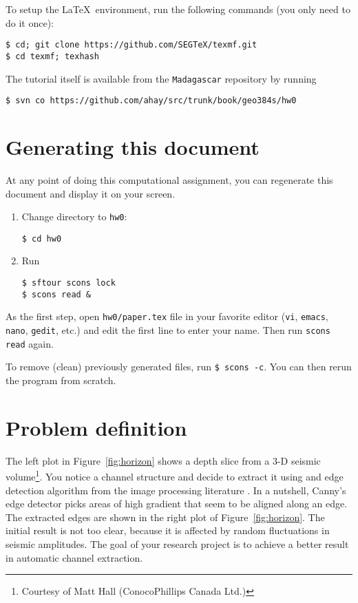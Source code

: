 To setup the \LaTeX\ environment, run the following commands (you only need to do it once):
\begin{verbatim}
$ cd; git clone https://github.com/SEGTeX/texmf.git
$ cd texmf; texhash
\end{verbatim}

The tutorial itself is available from the \texttt{Madagascar} repository
by running
\begin{verbatim}
$ svn co https://github.com/ahay/src/trunk/book/geo384s/hw0
\end{verbatim}

\section{Generating this document}

At any point of doing this computational assignment, you can
regenerate this document and display it on your screen.

\begin{enumerate}          
\item Change directory to \texttt{hw0}:
\begin{verbatim}
$ cd hw0
\end{verbatim}
\item Run
\begin{verbatim}
$ sftour scons lock
$ scons read &
\end{verbatim}
\end{enumerate}

As the first step, open \texttt{hw0/paper.tex} file in your favorite
editor (\texttt{vi}, \texttt{emacs}, \texttt{nano}, \texttt{gedit}, etc.) and edit the first line to enter your name. Then
run \texttt{scons read} again.

To remove (clean) previously generated files, run \texttt{\$ scons -c}. You can then rerun the program from scratch.


\section{Problem definition}


The left plot in Figure~\ref{fig:horizon} shows a depth slice from a 3-D
seismic volume\footnote{Courtesy of Matt Hall (ConocoPhillips Canada
Ltd.)}. You notice a channel structure and decide to extract it using
and edge detection algorithm from the image processing literature
\cite[]{canny}. In a nutshell, Canny's edge detector picks areas of
high gradient that seem to be aligned along an edge. The extracted
edges are shown in the right plot of Figure~\ref{fig:horizon}. The initial
result is not too clear, because it is affected by random
fluctuations in seismic amplitudes. The goal of your research project
is to achieve a better result in automatic channel extraction.

